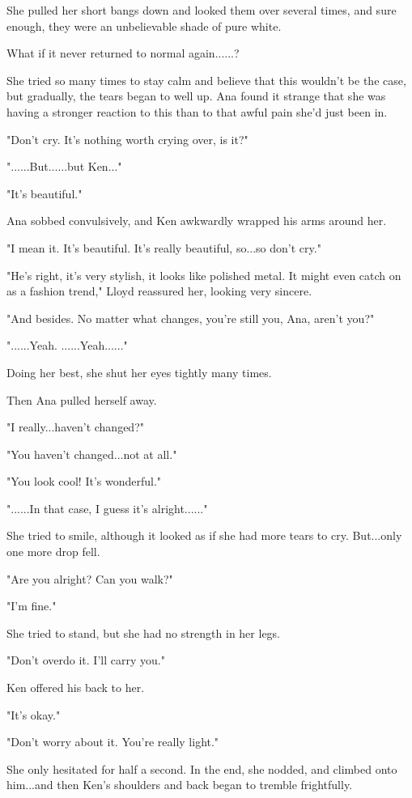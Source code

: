 \documentclass[
]{article}
\begin{document}
She pulled her short bangs down and looked them over several times, and
sure enough, they were an unbelievable shade of pure white.

What if it never returned to normal again......?

She tried so many times to stay calm and believe that this wouldn't be
the case, but gradually, the tears began to well up. Ana found it
strange that she was having a stronger reaction to this than to that
awful pain she'd just been in.

"Don't cry. It's nothing worth crying over, is it?"

"......But......but Ken..."

"It's beautiful."

Ana sobbed convulsively, and Ken awkwardly wrapped his arms around her.

"I mean it. It's beautiful. It's really beautiful, so...so don't cry."

"He's right, it's very stylish, it looks like polished metal. It might
even catch on as a fashion trend," Lloyd reassured her, looking very
sincere.

"And besides. No matter what changes, you're still you, Ana, aren't
you?"

"......Yeah. ......Yeah......"

Doing her best, she shut her eyes tightly many times.

Then Ana pulled herself away.

"I really...haven't changed?"

"You haven't changed...not at all."

"You look cool! It's wonderful."

"......In that case, I guess it's alright......"

She tried to smile, although it looked as if she had more tears to cry.
But...only one more drop fell.

"Are you alright? Can you walk?"

"I'm fine."

She tried to stand, but she had no strength in her legs.

"Don't overdo it. I'll carry you."

Ken offered his back to her.

"It's okay."

"Don't worry about it. You're really light."

She only hesitated for half a second. In the end, she nodded, and
climbed onto him...and then Ken's shoulders and back began to tremble
frightfully.
\end{document}
